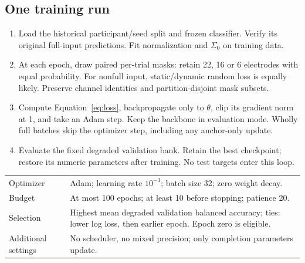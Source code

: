 \documentclass[11pt,a4paper]{article}
\begin{document}
\begin{center}
\end{center}

\subsection*{One training run}
\begin{enumerate}
\item Load the historical participant/seed split and frozen classifier. Verify
its original full-input predictions. Fit normalization and $\Sigma_0$ on training data.
\item At each epoch, draw paired per-trial masks: retain 22, 16 or 6 electrodes
with equal probability. For nonfull input, static/dynamic random loss is equally
likely. Preserve channel identities and partition-disjoint mask subsets.
\item Compute Equation~\eqref{eq:loss}, backpropagate only to $\theta$, clip its
gradient norm at 1, and take an Adam step. Keep the backbone in evaluation mode.
Wholly full batches skip the optimizer step, including any anchor-only update.
\item Evaluate the fixed degraded validation bank. Retain the best checkpoint;
restore its numeric parameters after training. No test targets enter this loop.
\end{enumerate}
\begin{tabularx}{\linewidth}{@{}lY@{}}\toprule
Optimizer & Adam; learning rate $10^{-3}$; batch size 32; zero weight decay. \\
Budget & At most 100 epochs; at least 10 before stopping; patience 20. \\
Selection & Highest mean degraded validation balanced accuracy; ties: lower
log loss, then earlier epoch. Epoch zero is eligible. \\
Additional settings & No scheduler, no mixed precision; only completion parameters update. \\ \bottomrule
\end{tabularx}
\end{document}
